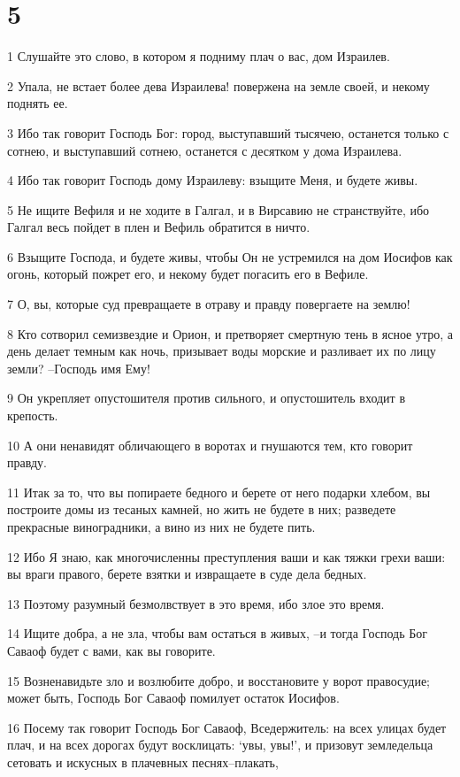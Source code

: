 \chapter{5}

\par 1 Слушайте это слово, в котором я подниму плач о вас, дом Израилев.
\par 2 Упала, не встает более дева Израилева! повержена на земле своей, и некому поднять ее.
\par 3 Ибо так говорит Господь Бог: город, выступавший тысячею, останется только с сотнею, и выступавший сотнею, останется с десятком у дома Израилева.
\par 4 Ибо так говорит Господь дому Израилеву: взыщите Меня, и будете живы.
\par 5 Не ищите Вефиля и не ходите в Галгал, и в Вирсавию не странствуйте, ибо Галгал весь пойдет в плен и Вефиль обратится в ничто.
\par 6 Взыщите Господа, и будете живы, чтобы Он не устремился на дом Иосифов как огонь, который пожрет его, и некому будет погасить его в Вефиле.
\par 7 О, вы, которые суд превращаете в отраву и правду повергаете на землю!
\par 8 Кто сотворил семизвездие и Орион, и претворяет смертную тень в ясное утро, а день делает темным как ночь, призывает воды морские и разливает их по лицу земли? --Господь имя Ему!
\par 9 Он укрепляет опустошителя против сильного, и опустошитель входит в крепость.
\par 10 А они ненавидят обличающего в воротах и гнушаются тем, кто говорит правду.
\par 11 Итак за то, что вы попираете бедного и берете от него подарки хлебом, вы построите домы из тесаных камней, но жить не будете в них; разведете прекрасные виноградники, а вино из них не будете пить.
\par 12 Ибо Я знаю, как многочисленны преступления ваши и как тяжки грехи ваши: вы враги правого, берете взятки и извращаете в суде дела бедных.
\par 13 Поэтому разумный безмолвствует в это время, ибо злое это время.
\par 14 Ищите добра, а не зла, чтобы вам остаться в живых, --и тогда Господь Бог Саваоф будет с вами, как вы говорите.
\par 15 Возненавидьте зло и возлюбите добро, и восстановите у ворот правосудие; может быть, Господь Бог Саваоф помилует остаток Иосифов.
\par 16 Посему так говорит Господь Бог Саваоф, Вседержитель: на всех улицах будет плач, и на всех дорогах будут восклицать: `увы, увы!', и призовут земледельца сетовать и искусных в плачевных песнях--плакать,
